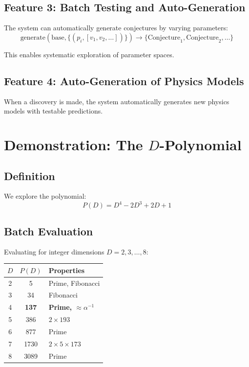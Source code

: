 \documentclass[11pt,a4paper]{article}
\begin{document}
\subsection{Feature 3: Batch Testing and Auto-Generation}

The system can automatically generate conjectures by varying parameters:
\begin{equation}
\text{generate}(\text{base}, \{(p_i, [v_1, v_2, \ldots])\}) \to \{\text{Conjecture}_1, \text{Conjecture}_2, \ldots\}
\end{equation}

This enables systematic exploration of parameter spaces.

\subsection{Feature 4: Auto-Generation of Physics Models}

When a discovery is made, the system automatically generates new physics models with testable predictions.

\section{Demonstration: The $D$-Polynomial}

\subsection{Definition}

We explore the polynomial:
\begin{equation}
P(D) = D^4 - 2D^3 + 2D + 1
\end{equation}

\subsection{Batch Evaluation}

Evaluating for integer dimensions $D = 2, 3, \ldots, 8$:

\begin{center}
\begin{tabular}{|c|c|l|}
\hline
$D$ & $P(D)$ & Properties \\
\hline
2 & 5 & Prime, Fibonacci \\
3 & 34 & Fibonacci \\
4 & \textbf{137} & \textbf{Prime, $\approx \alpha^{-1}$} \\
5 & 386 & $2 \times 193$ \\
6 & 877 & Prime \\
7 & 1730 & $2 \times 5 \times 173$ \\
8 & 3089 & Prime \\
\hline
\end{tabular}
\end{center}
\end{document}
